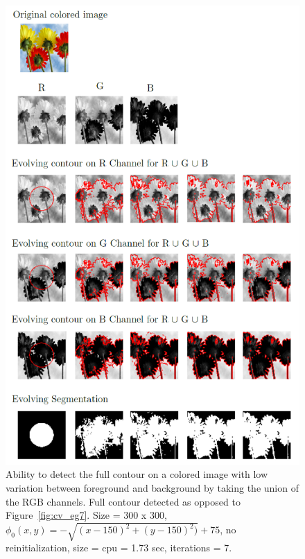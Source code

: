\documentclass[10pt,twocolumn,letterpaper]{article}
\begin{document}
\begin{figure}[t!]
\centering
\includegraphics[width=12cm]{flowers.png}
\caption{Ability to detect the full contour on a colored image with low variation between foreground and background by taking the union of the RGB channels.
Full contour detected as opposed to Figure~\ref{fig:cv_eg7}. Size = 300 x 300, $\phi_{0}(x,y) = - \sqrt{(x - 150)^2 + (y - 150)^2)} + 75$, no reinitialization,
size = cpu = 1.73 sec, iterations = 7.}
\label{fig:flowers}
\end{figure}
\end{document}
